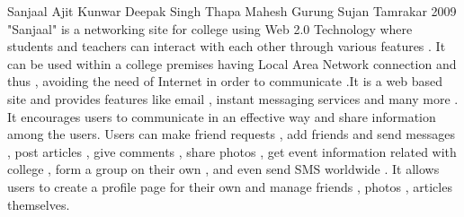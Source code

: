  \begin{conf-abstract}[]
{Sanjaal }
{
Ajit Kunwar
Deepak Singh Thapa
Mahesh Gurung
Sujan Tamrakar
}
{2009}
"Sanjaal" is a networking site for college using Web 2.0 Technology where students and teachers can interact with each other through various features . It can be used within a college premises having Local Area Network connection and thus , avoiding the need of Internet in order to communicate .It is a web based site and provides features like email , instant messaging services and many more . It encourages users to communicate in an effective way and share information among the users. Users can make friend requests , add friends and send messages , post articles , give comments , share photos , get event information related with college , form a group on their own , and even send SMS  worldwide . It allows users to create a profile page for their own and manage friends , photos , articles themselves. 
  \end{conf-abstract}